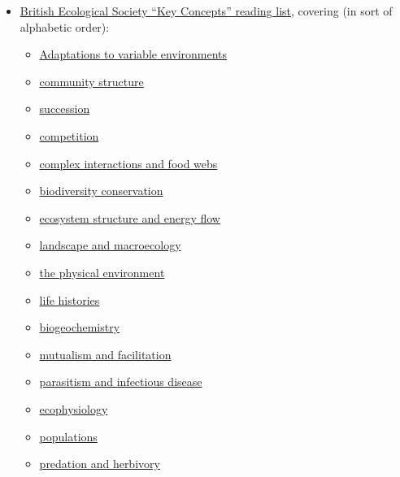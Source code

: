 \documentclass[english,11pt,a4paper, landscape]{article}
\begin{document}
\begin{itemize}
	\item \href{https://uni-freiburg.zoom.us/j/64644902817?pwd=OEFLaWxUWW1QdnRVUnQ3TXRnNGFzQT09}{British Ecological Society ``Key Concepts'' reading list}, covering (in sort of alphabetic order): \begin{itemize}
		\item \href{https://methodsblog.com/2024/01/17/ikey-concepts-in-ecology-i-adaptations-to-variable-environments/}{Adaptations to variable environments}
		\item \href{https://jecologyblog.com/2023/11/29/key-concepts-in-ecology-community-structure/}{community structure}
		\item \href{https://jecologyblog.com/2024/01/25/ikey-concepts-in-ecology-i-community-succession/}{succession}
		\item \href{https://methodsblog.com/2024/02/21/key-concepts-in-ecology-competition/}{competition}
		\item \href{https://animalecologyinfocus.com/2024/01/10/key-concepts-in-ecology-complex-interactions-and-foodwebs/}{complex interactions and food webs}
		\item \href{https://relationalthinkingblog.com/2024/01/11/key-concepts-in-ecology-conservation-of-global-biodiversity/}{biodiversity conservation}
		\item \href{https://jecologyblog.com/2023/12/05/key-concepts-in-ecology-ecosystem-structure-and-energy-flow/}{ecosystem structure and energy flow}	
		\item \href{https://functionalecologists.com/2023/12/07/key-concepts-in-ecology-landscape-ecology-and-macroecology/}{landscape and macroecology}
		\item \href{https://appliedecologistsblog.com/2024/01/10/key-concepts-in-ecology-life-and-the-physical-environment/}{the physical environment}
		\item \href{https://animalecologyinfocus.com/2023/11/30/key-concepts-in-ecology-life-histories/}{life histories}
		\item \href{https://jecologyblog.com/2024/02/06/key-concepts-in-ecology-movement-of-elements-in-ecosystems/}{biogeochemistry}
		\item \href{https://functionalecologists.com/2023/12/01/key-concepts-in-ecology-mutualisms-and-facilitation/}{mutualism and facilitation}
		\item \href{https://animalecologyinfocus.com/2023/12/06/key-concepts-in-ecology-parasitism-and-infectious-disease/}{parasitism and infectious disease}
		\item \href{https://functionalecologists.com/2023/12/15/key-concepts-in-ecology-physiological-ecology/}{ecophysiology}
		\item \href{https://appliedecologistsblog.com/2024/01/30/key-concepts-in-ecology-populations/}{populations}
		\item \href{https://animalecologyinfocus.com/2024/01/24/key-concepts-in-ecology-predation-and-herbivory/}{predation and herbivory}
	\end{itemize} 	
\end{itemize}
\end{document}
